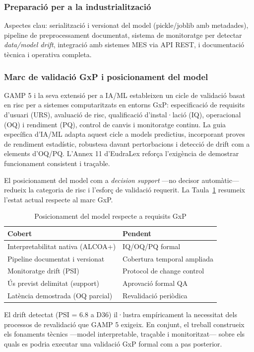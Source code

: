 \subsubsection{Preparació per a la industrialització}
\label{subsubsec:preparacio_industrialitzacio}

Aspectes clau: serialització i versionat del model (pickle/joblib amb metadades), pipeline de preprocessament documentat, sistema de monitoratge per detectar \emph{data/model drift}, integració amb sistemes MES via API REST, i documentació tècnica i operativa completa.

\subsubsection{Marc de validació GxP i posicionament del model}
\label{subsubsec:marc_validacio_gxp}

GAMP 5 \cite{gamp5} i la seva extensió per a IA/ML \cite{gamp_ai_ml} estableixen un cicle de validació basat en risc per a sistemes computaritzats en entorns GxP: especificació de requisits d'usuari (URS), avaluació de risc, qualificació d'instal·lació (IQ), operacional (OQ) i rendiment (PQ), control de canvis i monitoratge continu. La guia específica d'IA/ML \cite{gamp_ai_ml} adapta aquest cicle a models predictius, incorporant proves de rendiment estadístic, robustesa davant pertorbacions i detecció de drift com a elements d'OQ/PQ. L'Annex 11 d'EudraLex \cite{eudralex_annex11} reforça l'exigència de demostrar funcionament consistent i traçable.

El posicionament del model com a \emph{decision support} —no decisor automàtic— redueix la categoria de risc i l'esforç de validació requerit. La Taula~\ref{tab:gxp_positioning} resumeix l'estat actual respecte al marc GxP.

\begin{table}[htbp]
\centering
\caption{Posicionament del model respecte a requisits GxP}
\label{tab:gxp_positioning}
\footnotesize
\begin{tabular}{@{}p{}p{}@{}}
\toprule
\textbf{Cobert} & \textbf{Pendent} \\
\midrule
Interpretabilitat nativa (ALCOA+) & IQ/OQ/PQ formal \\
Pipeline documentat i versionat & Cobertura temporal ampliada \\
Monitoratge drift (PSI) & Protocol de change control \\
Ús previst delimitat (support) & Aprovació formal QA \\
Latència demostrada (OQ parcial) & Revalidació periòdica \\
\bottomrule
\end{tabular}
\end{table}

El drift detectat (PSI = 6.8 a D36) il·lustra empíricament la necessitat dels processos de revalidació que GAMP 5 exigeix. En conjunt, el treball construeix els fonaments tècnics —model interpretable, traçable i monitoritzat— sobre els quals es podria executar una validació GxP formal com a pas posterior.


